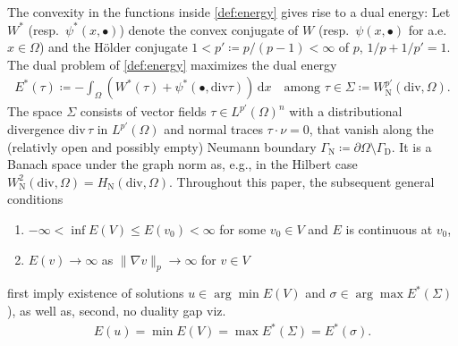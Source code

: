 \documentclass[a4paper]{amsart}
\numberwithin{equation}{section}
\renewcommand{\d}[1]{\,\mathrm{d}#1}
\renewcommand{\div}{\mathrm{div}}
\theoremstyle{remark}
\begin{document}
The convexity in the functions inside \eqref{def:energy} gives rise to a dual energy: 
Let $W^*$ (resp.~$\psi^*(x,\bullet)$) denote the convex conjugate of $W$ (resp.~$\psi(x,\bullet)$ for a.e.~$x \in \Omega$) and 
the H\"older conjugate 
$1< p' \coloneqq p/(p-1) <\infty$ of $p$, $1/p + 1/p' = 1$.
%
The dual problem of \eqref{def:energy} maximizes the dual energy
\begin{align}\label{def:dual-energy}
	E^*(\tau) \coloneqq -\int_\Omega (W^*(\tau) + \psi^*(\bullet, \div \tau)) \d{x}
    \quad\text{among } \tau \in \Sigma \coloneqq W^{p'}_\mathrm{N}(\div,\Omega). 
\end{align}
The space $\Sigma$ consists 
of vector fields 
$\tau \in L^{p'}(\Omega)^n$ with a distributional divergence $\div\, \tau$ in  $L^{p'}(\Omega)$ 
and normal traces $\tau \cdot \nu=0$, that vanish along the 
(relativly open and possibly empty) Neumann boundary $\Gamma_\mathrm{N} \coloneqq \partial \Omega \setminus \Gamma_\mathrm{D}$. It is a Banach space
under the graph norm as, e.g., in the Hilbert case  $W^2_\mathrm{N}(\div,\Omega) = H_\mathrm{N}(\div,\Omega)$.
Throughout this paper, the subsequent general conditions 
\begin{enumerate}[wide]
    \item[(A1)] $-\infty < \inf E(V) \leq E(v_0) < \infty$ for some $v_0 \in V$ and $E$ is continuous at $v_0$,
    \item[(A2)] $E(v) \to \infty$ as $\|\nabla v\|_p \to \infty$ for $v \in V$
\end{enumerate}
first  imply existence of solutions  $u \in \arg\min E(V)$ 
and $\sigma \in \arg \max E^*(\Sigma)$), as well as, second,  no duality gap 
\cite[Chapter 3, Theorem 4.2]{EkelandTeman1999} viz.
\begin{align}\label{eq:strong-duality}
    E(u) = \min E(V) = \max E^*(\Sigma) = E^*(\sigma).
\end{align}
 
\end{document}
